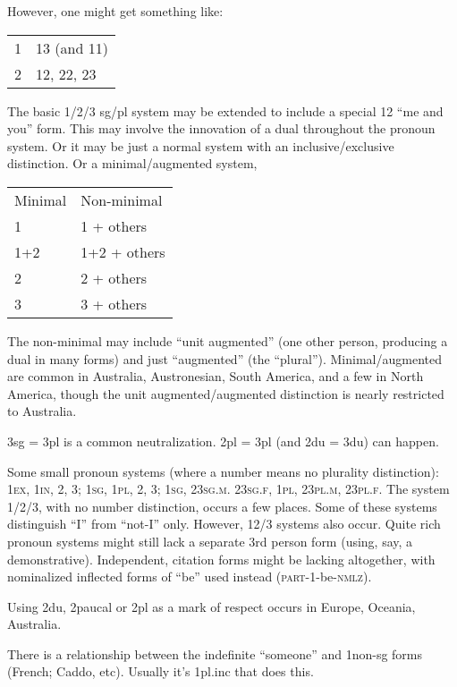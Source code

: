 \documentclass[11pt]{article}
\newcommand{\I}[1]{\textsc{#1}}   %
\begin{document}
However, one might get something like:

\begin{center}
\begin{tabular}{ll}
1 & 13 (and 11) \\
2 & 12, 22, 23     
\end{tabular}
\end{center}

The basic 1/2/3 sg/pl system may be extended to include a special 12
``me and you'' form.  This may involve the innovation of a dual
throughout the pronoun system.  Or it may be just a normal system with
an inclusive/exclusive distinction.  Or a minimal/augmented system, 

\begin{center}
\begin{tabular}{ll}
Minimal & Non-minimal \\
1  & 1 + others \\
1+2 & 1+2 + others \\
2 & 2 + others \\
3 & 3 + others 
\end{tabular}
\end{center}

\noindent The non-minimal may include ``unit augmented'' (one other
person, producing a dual in many forms) and just ``augmented'' (the
``plural'').  Minimal/augmented are common in Australia, Austronesian,
South America, and a few in North America, though the unit
augmented/augmented distinction is nearly restricted to Australia.

3sg = 3pl is a common neutralization.  2pl = 3pl (and 2du = 3du) can
happen.

Some small pronoun systems (where a number means no plurality
distinction): \I{1ex, 1in, 2, 3; 1sg, 1pl, 2, 3; 1sg, 23sg.m. 23sg.f,
1pl, 23pl.m, 23pl.f}.  The system 1/2/3, with no number distinction,
occurs a few places.  Some of these systems distinguish ``I'' from
``not-I'' only.  However, 12/3 systems also occur.  Quite rich pronoun
systems might still lack a separate 3rd person form (using, say, a
demonstrative).  Independent, citation forms might be lacking
altogether, with nominalized inflected forms of ``be'' used instead
(\I{part-1}-be-\I{nmlz}).

Using 2du, 2paucal or 2pl as a mark of respect occurs in Europe,
Oceania, Australia.

There is a relationship between the indefinite ``someone'' and
1non-sg forms (French; Caddo, etc).  Usually it's 1pl.inc that does
this. 
\end{document}
